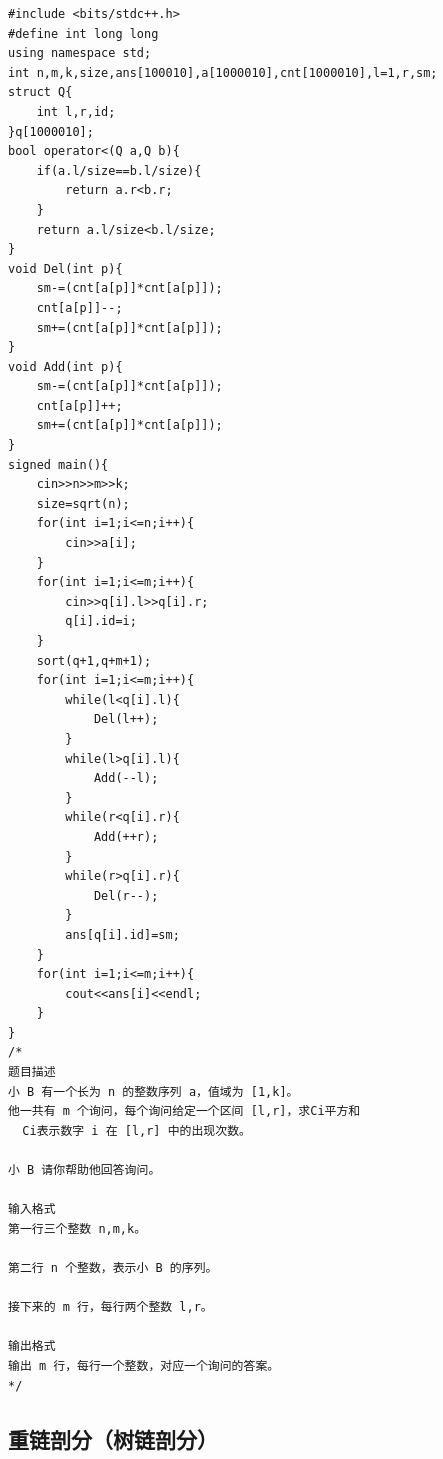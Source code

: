 \documentclass[11pt,a4paper]{ctexart}
\begin{document}
\begin{lstlisting}
#include <bits/stdc++.h>
#define int long long
using namespace std;
int n,m,k,size,ans[100010],a[1000010],cnt[1000010],l=1,r,sm;
struct Q{
	int l,r,id;
}q[1000010];
bool operator<(Q a,Q b){
	if(a.l/size==b.l/size){
		return a.r<b.r;
	}
	return a.l/size<b.l/size;
}
void Del(int p){
	sm-=(cnt[a[p]]*cnt[a[p]]);
	cnt[a[p]]--;
	sm+=(cnt[a[p]]*cnt[a[p]]);
}
void Add(int p){
	sm-=(cnt[a[p]]*cnt[a[p]]);
	cnt[a[p]]++;
	sm+=(cnt[a[p]]*cnt[a[p]]);
}
signed main(){
	cin>>n>>m>>k;
	size=sqrt(n);
	for(int i=1;i<=n;i++){
		cin>>a[i];
	}
	for(int i=1;i<=m;i++){
		cin>>q[i].l>>q[i].r;
		q[i].id=i;
	}
	sort(q+1,q+m+1);
	for(int i=1;i<=m;i++){
		while(l<q[i].l){
			Del(l++);
		}
		while(l>q[i].l){
			Add(--l);
		}
		while(r<q[i].r){
			Add(++r);
		}
		while(r>q[i].r){
			Del(r--);
		}
		ans[q[i].id]=sm;
	}
	for(int i=1;i<=m;i++){
		cout<<ans[i]<<endl;
	}
}
/*
题目描述
小 B 有一个长为 n 的整数序列 a，值域为 [1,k]。
他一共有 m 个询问，每个询问给定一个区间 [l,r]，求Ci平方和 
  Ci表示数字 i 在 [l,r] 中的出现次数。

小 B 请你帮助他回答询问。

输入格式
第一行三个整数 n,m,k。

第二行 n 个整数，表示小 B 的序列。

接下来的 m 行，每行两个整数 l,r。

输出格式
输出 m 行，每行一个整数，对应一个询问的答案。
*/
\end{lstlisting}

\subsection{重链剖分（树链剖分）}
\end{document}
